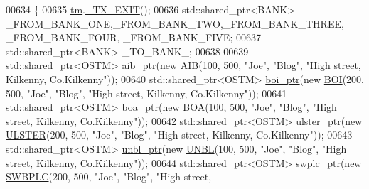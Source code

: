 \begin{DoxyCode}
00634                                                                     \{
00635     \hyperlink{class_my_test_c_ase_a422e6e5d4ddedea384be96031c89b72b_a422e6e5d4ddedea384be96031c89b72b}{tm}.\hyperlink{class_t_m_a5e2d1127f2429f2f524d25f430eade06_a5e2d1127f2429f2f524d25f430eade06}{\_TX\_EXIT}();
00636     std::shared\_ptr<BANK> \_FROM\_BANK\_ONE,\_FROM\_BANK\_TWO,\_FROM\_BANK\_THREE, \_FROM\_BANK\_FOUR, \_FROM\_BANK\_FIVE;
00637     std::shared\_ptr<BANK> \_TO\_BANK\_;
00638     
00639     std::shared\_ptr<OSTM> \hyperlink{class_my_test_c_ase_adad50e8278b64aa0321000b528e5362c_adad50e8278b64aa0321000b528e5362c}{aib\_ptr}(\textcolor{keyword}{new} \hyperlink{class_a_i_b}{AIB}(100, 500, \textcolor{stringliteral}{"Joe"}, \textcolor{stringliteral}{"Blog"}, \textcolor{stringliteral}{"High street, Kilkenny,
       Co.Kilkenny"}));
00640     std::shared\_ptr<OSTM> \hyperlink{class_my_test_c_ase_a5554de9e3e6393a89c66c036c529720b_a5554de9e3e6393a89c66c036c529720b}{boi\_ptr}(\textcolor{keyword}{new} \hyperlink{class_b_o_i}{BOI}(200, 500, \textcolor{stringliteral}{"Joe"}, \textcolor{stringliteral}{"Blog"}, \textcolor{stringliteral}{"High street, Kilkenny,
       Co.Kilkenny"}));
00641     std::shared\_ptr<OSTM> \hyperlink{class_my_test_c_ase_ae0b2db5d35e25b3139beeda0705494f0_ae0b2db5d35e25b3139beeda0705494f0}{boa\_ptr}(\textcolor{keyword}{new} \hyperlink{class_b_o_a}{BOA}(100, 500, \textcolor{stringliteral}{"Joe"}, \textcolor{stringliteral}{"Blog"}, \textcolor{stringliteral}{"High street, Kilkenny,
       Co.Kilkenny"}));
00642     std::shared\_ptr<OSTM> \hyperlink{class_my_test_c_ase_a4f9f72374d3d15be7cdf16412c4d7ed3_a4f9f72374d3d15be7cdf16412c4d7ed3}{ulster\_ptr}(\textcolor{keyword}{new} \hyperlink{class_u_l_s_t_e_r}{ULSTER}(200, 500, \textcolor{stringliteral}{"Joe"}, \textcolor{stringliteral}{"Blog"}, \textcolor{stringliteral}{"High street,
       Kilkenny, Co.Kilkenny"}));
00643     std::shared\_ptr<OSTM> \hyperlink{class_my_test_c_ase_a0ca634b597d6c0e136d632268853d5a7_a0ca634b597d6c0e136d632268853d5a7}{unbl\_ptr}(\textcolor{keyword}{new} \hyperlink{class_u_n_b_l}{UNBL}(100, 500, \textcolor{stringliteral}{"Joe"}, \textcolor{stringliteral}{"Blog"}, \textcolor{stringliteral}{"High street, Kilkenny,
       Co.Kilkenny"}));
00644     std::shared\_ptr<OSTM> \hyperlink{class_my_test_c_ase_aa8ccae9a5a7feb5bc47591c55a82d0cd_aa8ccae9a5a7feb5bc47591c55a82d0cd}{swplc\_ptr}(\textcolor{keyword}{new} \hyperlink{class_s_w_b_p_l_c}{SWBPLC}(200, 500, \textcolor{stringliteral}{"Joe"}, \textcolor{stringliteral}{"Blog"}, \textcolor{stringliteral}{"High street,
}
\end{DoxyCode}
